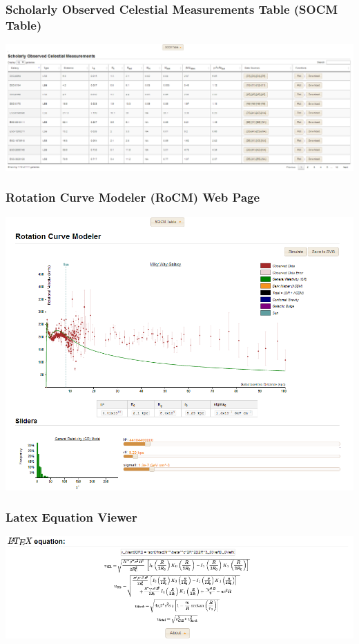 \documentclass[titlepage]{article}
\begin{document}
\subsubsection{Scholarly Observed Celestial Measurements Table (SOCM Table)}
\begin{adjustwidth}{-2cm}{0pt}
\includegraphics[scale=0.5]{gui/socmtable.png}
\end{adjustwidth}

\subsubsection{Rotation Curve Modeler (RoCM) Web Page}
\begin{adjustwidth}{-2cm}{0pt}
\includegraphics[scale=0.8]{gui/rocm1.png}
\end{adjustwidth}

\subsubsection{Latex Equation Viewer}
\begin{adjustwidth}{-2cm}{0pt}
\includegraphics[scale=0.8]{gui/latex.png}
\end{adjustwidth}
\end{document}
